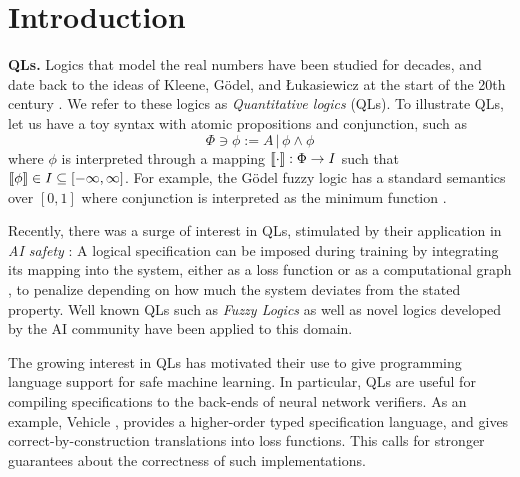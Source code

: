 \documentclass[sigplan, screen, review, nonacm]{acmart}
\begin{document}
\maketitle

\section{Introduction}

\textbf{QLs.} Logics that model the real numbers have been studied for decades, and date back to the ideas of Kleene, G\"{o}del, and Łukasiewicz at the start of the 20th century \cite{cintula2011handbook,prooffuzzy}. We refer to these logics as \textit{Quantitative logics} (QLs). To illustrate QLs, let us have a toy syntax with atomic propositions and conjunction, such as 
\begin{equation*}
    \Phi \ni \phi := A \,|\, \phi \land \phi
\end{equation*} 
where $\phi$ is interpreted through a mapping $\llbracket \cdot \rrbracket : \Phi \rightarrow I$ such that $ \llbracket \phi \rrbracket \in I \subseteq [-\infty,\infty]$. For example, the G\"{o}del fuzzy logic has a standard semantics over $[0, 1]$ where conjunction is interpreted as the minimum function \citep{cintula2011handbook}.

Recently, there was a surge of interest in QLs, stimulated by their application in \emph{AI safety} \cite{davidad24, dalrymple2024guaranteedsafeaiframework}: A logical specification can be imposed during training by integrating its mapping into the system, either as a loss function \citep{slusarz2023logic,van2022analyzing} or as a computational graph \cite{serafini2016logic, petersen2022deep, choi2020probabilistic}, to penalize depending on how much the system deviates from the stated property. Well known QLs such as \textit{Fuzzy Logics} \citep{cintula2011handbook} as well as novel logics developed by the AI community \citep{serafini2016logic, varnai2020robustness, fischer2019dl2} have been applied to this domain.

The growing interest in QLs has motivated their use to give programming language support for safe machine learning. In particular, QLs are useful for compiling specifications to the back-ends of neural network verifiers. As an example, Vehicle \citep{vehicle}, provides a higher-order typed specification language, and gives correct-by-construction translations into loss functions. This calls for stronger guarantees about the correctness of such implementations.
\end{document}
